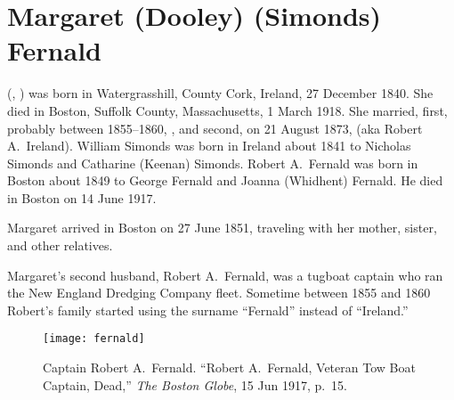 \section{Margaret (Dooley) (Simonds) Fernald}

 (, ) was born in Watergrasshill, County Cork, Ireland, 27 December 1840.\cite{Margaret3DooleyBaptism} She died in Boston, Suffolk County, Massachusetts, 1 March 1918.\cite{Margaret3DooleyDeath} She married, first, probably between 1855--1860, ,\cite{WilliamSimondsMarriage} and second, on 21 August 1873, \cite{RobertFernaldMarriage} (aka Robert A.\ Ireland).\cite{Census1855RobertFernald} William Simonds was born in Ireland about 1841\cite{Census1855WilliamSimonds} to Nicholas Simonds and Catharine (Keenan) Simonds.\cite{WilliamSimondsDeath,CatharineSimondsDeath} Robert A.\ Fernald was born in Boston about 1849 to George Fernald and Joanna (Whidhent) Fernald.\cite{RobertFernaldMarriage,JoannaFernaldDeath} He died in Boston on 14 June 1917.\cite{RobertFernaldDeath}

Margaret arrived in Boston on 27 June 1851, traveling with her mother, sister, and other relatives.\cite{Chascay}

Margaret's second husband, Robert A.\ Fernald, was a tugboat captain who ran the New England Dredging Company fleet.\cite{RobertFernaldDeath} Sometime between 1855 and 1860 Robert's family started using the surname ``Fernald'' instead of ``Ireland.''\cite{Census1855RobertFernald,Census1860RobertFernald}

\begin{figure}
	\centering
	\texttt{[image: fernald]}
	\caption{Captain Robert A.\ Fernald. ``Robert A.\ Fernald, Veteran Tow Boat Captain, Dead,'' \textit{The Boston Globe}, 15 Jun 1917, p.\ 15.}
\end{figure}

